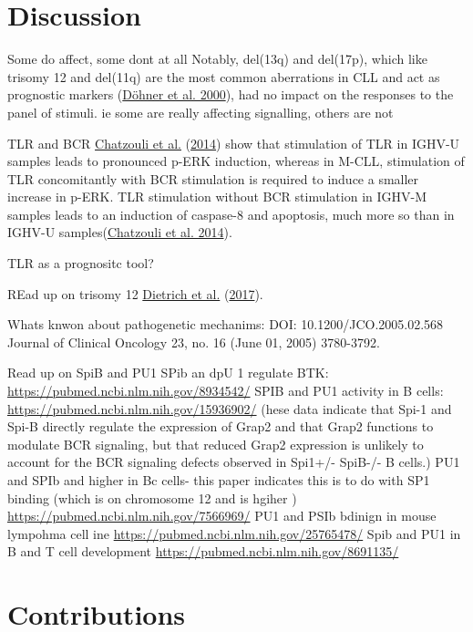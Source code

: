 \documentclass[11pt, a4paper, twosided]{book}
\begin{document}
\hypertarget{discussion-1}{%
\section{Discussion}\label{discussion-1}}

Some do affect, some dont at all
Notably, del(13q) and del(17p), which like trisomy 12 and del(11q) are the most common aberrations in CLL and act as prognostic markers (\protect\hyperlink{ref-Dohner2000}{Döhner et al. 2000}), had no impact on the responses to the panel of stimuli.
ie some are really affecting signalling, others are not

TLR and BCR
\protect\hyperlink{ref-Chatzouli2014}{Chatzouli et al.} (\protect\hyperlink{ref-Chatzouli2014}{2014}) show that stimulation of TLR in IGHV-U samples leads to pronounced p-ERK induction, whereas in M-CLL, stimulation of TLR concomitantly with BCR stimulation is required to induce a smaller increase in p-ERK. TLR stimulation without BCR stimulation in IGHV-M samples leads to an induction of caspase-8 and apoptosis, much more so than in IGHV-U samples(\protect\hyperlink{ref-Chatzouli2014}{Chatzouli et al. 2014}).

TLR as a prognositc tool?

REad up on trisomy 12
\protect\hyperlink{ref-JCIpaper}{Dietrich et al.} (\protect\hyperlink{ref-JCIpaper}{2017}).

Whats knwon about pathogenetic mechanims:
DOI: 10.1200/JCO.2005.02.568 Journal of Clinical Oncology 23, no. 16 (June 01, 2005) 3780-3792.

Read up on SpiB and PU1
SPib an dpU 1 regulate BTK: \url{https://pubmed.ncbi.nlm.nih.gov/8934542/}
SPIB and PU1 activity in B cells: \url{https://pubmed.ncbi.nlm.nih.gov/15936902/}
(hese data indicate that Spi-1 and Spi-B directly regulate the expression of Grap2 and that Grap2 functions to modulate BCR signaling, but that reduced Grap2 expression is unlikely to account for the BCR signaling defects observed in Spi1+/- SpiB-/- B cells.)
PU1 and SPIb and higher in Bc cells- this paper indicates this is to do with SP1 binding (which is on chromosome 12 and is hgiher ) \url{https://pubmed.ncbi.nlm.nih.gov/7566969/}
PU1 and PSIb bdinign in mouse lympohma cell ine \url{https://pubmed.ncbi.nlm.nih.gov/25765478/}
Spib and PU1 in B and T cell development \url{https://pubmed.ncbi.nlm.nih.gov/8691135/}

\hypertarget{contributions}{%
\section{Contributions}\label{contributions}}
\end{document}
